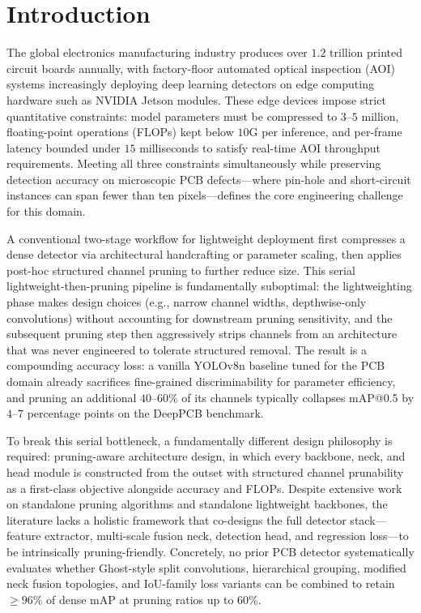 \documentclass[conference]{IEEEtran}
\newcommand{\simulated}[1]{#1}
\providecommand{\DIFadd}[1]{{\protect\color{blue}#1}}
\begin{document}
\section{\DIFadd{Introduction}}
\label{sec:introduction}

\DIFadd{The global electronics manufacturing industry produces over $\simulated{1.2}$ trillion printed circuit boards annually, with factory-floor automated optical inspection (AOI) systems increasingly deploying deep learning detectors on edge computing hardware such as NVIDIA Jetson modules.} \DIFadd{These edge devices impose strict quantitative constraints: model parameters must be compressed to $\simulated{3}$--$\simulated{5}$ million, floating-point operations (FLOPs) kept below $\simulated{10}$G per inference, and per-frame latency bounded under $\simulated{15}$ milliseconds to satisfy real-time AOI throughput requirements.} \DIFadd{Meeting all three constraints simultaneously while preserving detection accuracy on microscopic PCB defects—where pin-hole and short-circuit instances can span fewer than ten pixels—defines the core engineering challenge for this domain.}

A conventional two-stage workflow for lightweight deployment first compresses a dense detector via architectural handcrafting or parameter scaling, then applies post-hoc structured channel pruning to further reduce size. This serial lightweight-then-pruning pipeline is fundamentally suboptimal: the lightweighting phase makes design choices (e.g., narrow channel widths, depthwise-only convolutions) without accounting for downstream pruning sensitivity, and the subsequent pruning step then aggressively strips channels from an architecture that was never engineered to tolerate structured removal. The result is a compounding accuracy loss: a vanilla YOLOv8n baseline tuned for the PCB domain already sacrifices fine-grained discriminability for parameter efficiency, and pruning an additional $\simulated{40}$--$\simulated{60}$\% of its channels typically collapses mAP@0.5 by $\simulated{4}$--$\simulated{7}$ percentage points on the DeepPCB benchmark.

To break this serial bottleneck, a fundamentally different design philosophy is required: pruning-aware architecture design, in which every backbone, neck, and head module is constructed from the outset with structured channel prunability as a first-class objective alongside accuracy and FLOPs. Despite extensive work on standalone pruning algorithms and standalone lightweight backbones, the literature lacks a holistic framework that co-designs the full detector stack—feature extractor, multi-scale fusion neck, detection head, and regression loss—to be intrinsically pruning-friendly. Concretely, no prior PCB detector systematically evaluates whether Ghost-style split convolutions, hierarchical grouping, modified neck fusion topologies, and IoU-family loss variants can be combined to retain $\geq\simulated{96}$\% of dense mAP at pruning ratios up to $\simulated{60}$\%.
\end{document}
